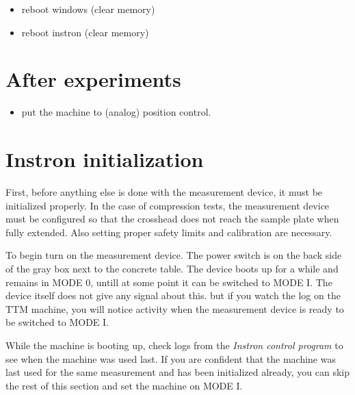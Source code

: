 \documentclass[a4paper]{article}
\begin{document}
\begin{itemize}
	\item reboot windows (clear memory)
  \item reboot instron (clear memory)
\end{itemize}

\section{After experiments}

\begin{itemize}
  \item put the machine to (analog) position control.
\end{itemize}


\section{Instron initialization}

First, before anything else is done with the measurement device, it
must be initialized properly. In the case of compression tests, the
measurement device must be configured so that the crosshead does not
reach the sample plate when fully extended. Also setting proper safety
limits and calibration are necessary.


To begin turn on the measurement device. The power switch is on the
back side of the gray box next to the concrete table. The device boots
up for a while and remains in \textsf{MODE 0}, untill at some point it
can be switched to \textsf{MODE I}. The device itself does not give
any signal about this. but if you watch the log on the TTM machine,
you will notice activity when the measurement device is ready to be
switched to \textsf{MODE I}.

While the machine is booting up, check logs from the {\it Instron
control program} to see when the machine was used last. If you are
confident that the machine was last used for the same measurement and
has been initialized already, you can skip the rest of this section
and set the machine on \textsf{MODE I}.
\end{document}
